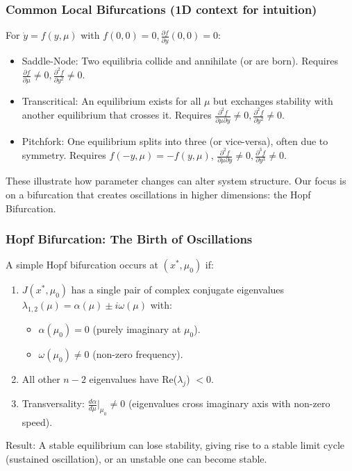 \documentclass[aspectratio=169]{beamer}
\begin{document}
\begin{frame}{\insertsectionhead}
	\frametitle{Common Local Bifurcations (1D context for intuition)}
	For $\dot{y} = f(y, \mu)$ with $f(0,0)=0, \frac{\partial f}{\partial y}(0,0)=0$:
	\begin{itemize}
		\item \alert{Saddle-Node}: Two equilibria collide and annihilate (or are born). Requires $\frac{\partial f}{\partial \mu} \neq 0, \frac{\partial^2 f}{\partial y^2} \neq 0$.
		\item \alert{Transcritical}: An equilibrium exists for all $\mu$ but exchanges stability with another equilibrium that crosses it. Requires $\frac{\partial^2 f}{\partial \mu \partial y} \neq 0, \frac{\partial^2 f}{\partial y^2} \neq 0$.
		\item \alert{Pitchfork}: One equilibrium splits into three (or vice-versa), often due to symmetry. Requires $f(-y,\mu)=-f(y,\mu)$, $\frac{\partial^2 f}{\partial \mu \partial y} \neq 0, \frac{\partial^3 f}{\partial y^3} \neq 0$.
	\end{itemize}
	These illustrate how parameter changes can alter system structure. Our focus is on a bifurcation that creates oscillations in higher dimensions: the Hopf Bifurcation.
\end{frame}

\begin{frame}{\insertsectionhead}
	\frametitle{Hopf Bifurcation: The Birth of Oscillations}
	A simple Hopf bifurcation occurs at $(x^*, \mu_0)$ if:
	\begin{enumerate}
		\item $J(x^*, \mu_0)$ has a \alert{single pair of complex conjugate eigenvalues} $\lambda_{1,2}(\mu) = \alpha(\mu) \pm i\omega(\mu)$ with:
			\begin{itemize}
				\item $\alpha(\mu_0) = 0$ (purely imaginary at $\mu_0$).
				\item $\omega(\mu_0) \neq 0$ (non-zero frequency).
			\end{itemize}
		\item All other $n-2$ eigenvalues have Re($\lambda_j$) $< 0$.
		\item \alert{Transversality}: $\frac{d\alpha}{d\mu}\bigg|_{\mu_0} \neq 0$ (eigenvalues cross imaginary axis with non-zero speed).
	\end{enumerate}
	\alert{Result}: A stable equilibrium can lose stability, giving rise to a stable \alert{limit cycle} (sustained oscillation), or an unstable one can become stable.
\end{frame}
\end{document}
